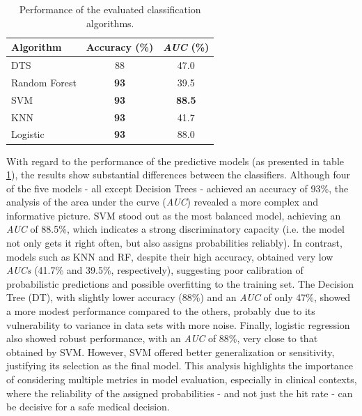\begin{table}[H]
  \centering
  \caption{Performance of the evaluated classification algorithms.}
  \label{tab:performance_azari}
  \begin{tabular}{|l|c|c|}
    \hline
    \textbf{Algorithm} & \textbf{Accuracy (\%)} & \textbf{\textit{AUC} (\%)} \\
    \hline
    DTS                & 88                     & 47.0                       \\
    Random Forest      & \textbf{93}            & 39.5                       \\
    SVM                & \textbf{93}            & \textbf{88.5}              \\
    KNN                & \textbf{93}            & 41.7                       \\
    Logistic           & \textbf{93}            & 88.0                       \\
    \hline
  \end{tabular}
\end{table}

With regard to the performance of the predictive models (as presented in table
\ref{tab:performance_azari}), the results show substantial differences between
the classifiers. Although four of the five models - all except Decision Trees -
achieved an accuracy of 93\%, the analysis of the area under the curve
(\textit{AUC}) revealed a more complex and informative picture. SVM stood out
as the most balanced model, achieving an \textit{AUC} of 88.5\%, which
indicates a strong discriminatory capacity (i.e. the model not only gets it
right often, but also assigns probabilities reliably). In contrast, models such
as KNN and RF, despite their high accuracy, obtained very low \textit{AUCs}
(41.7\% and 39.5\%, respectively), suggesting poor calibration of probabilistic
predictions and possible overfitting to the training set. The Decision Tree
(DT), with slightly lower accuracy (88\%) and an \textit{AUC} of only 47\%,
showed a more modest performance compared to the others, probably due to its
vulnerability to variance in data sets with more noise. Finally, logistic
regression also showed robust performance, with an \textit{AUC} of 88\%, very
close to that obtained by SVM. However, SVM offered better generalization or
sensitivity, justifying its selection as the final model. This analysis
highlights the importance of considering multiple metrics in model evaluation,
especially in clinical contexts, where the reliability of the assigned
probabilities - and not just the hit rate - can be decisive for a safe medical
decision.

